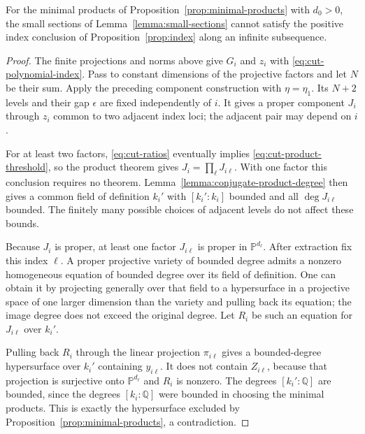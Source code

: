 \begin{proposition}\label{prop:product-cut}
For the minimal products of Proposition~\ref{prop:minimal-products}
with $d_0>0$, the small sections of
Lemma~\ref{lemma:small-sections} cannot satisfy the positive index
conclusion of Proposition~\ref{prop:index} along an infinite
subsequence.
\end{proposition}

\begin{proof}
The finite projections and norms above give $G_i$ and $z_i$ with
\eqref{eq:cut-polynomial-index}.  Pass to constant dimensions of
the projective factors and let $N$ be their sum.  Apply the preceding
component construction with $\eta=\eta_1$.  Its $N+2$ levels and their
gap $\epsilon$ are fixed independently of $i$.  It gives a proper
component $J_i$ through $z_i$ common to two adjacent index loci;
the adjacent pair may depend on $i$.

For at least two factors, \eqref{eq:cut-ratios} eventually implies
\eqref{eq:cut-product-threshold}, so the product theorem gives
$J_i=\prod_\ell J_{i\ell}$.  With one factor this conclusion
requires no theorem.  Lemma~\ref{lemma:conjugate-product-degree}
then gives a common field of definition $k_i'$ with
$[k_i':k_i]$ bounded and all $\deg J_{i\ell}$ bounded.
The finitely many possible choices of adjacent levels do not
affect these bounds.

Because $J_i$ is proper, at least one factor $J_{i\ell}$ is
proper in $\mathbb P^{d_\ell}$.  After extraction fix this index
$\ell$.  A proper projective variety of bounded degree admits a
nonzero homogeneous equation of bounded degree over its field of
definition.  One can obtain it by projecting generally over that
field to a hypersurface in a projective space of one larger
dimension than the variety and pulling back its equation; the
image degree does not exceed the original degree.  Let $R_i$ be
such an equation for $J_{i\ell}$ over $k_i'$.

Pulling back $R_i$ through the linear projection $\pi_{i\ell}$
gives a bounded-degree hypersurface over $k_i'$ containing
$y_{i\ell}$.  It does not contain $Z_{i\ell}$, because that
projection is surjective onto $\mathbb P^{d_\ell}$ and $R_i$ is
nonzero.  The degrees $[k_i':\mathbb Q]$ are bounded, since the
degrees $[k_i:\mathbb Q]$ were bounded in choosing the minimal
products.  This is exactly the hypersurface excluded by
Proposition~\ref{prop:minimal-products}, a contradiction.
\end{proof}


